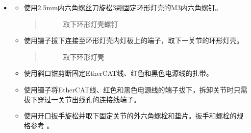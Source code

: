 \documentclass[a4paper,11pt,english,openany,oneside]{sphinxmanual}
\begin{document}
\begin{itemize}
\begin{itemize}
\item {} 
\sphinxAtStartPar
缓慢将大臂取下，同时将线束从二关节的出线孔逐一抽出，为防止线束端子卡住，推荐先抽出电源线，再抽出EtherCAT线。
\begin{quote}

\begin{figure}[H]
\centering
\capstart

\noindent{}
\caption{分离大臂}\label{\detokenize{_u66f4_u6362_u5173_u8282:id117}}\end{figure}
\end{quote}

\end{itemize}

\item {} 
\sphinxAtStartPar
{}
\begin{itemize}
\item {} 
\sphinxAtStartPar
使用2.5mm内六角螺丝刀旋松3颗固定环形灯壳的M3内六角螺钉。
\begin{quote}

\begin{figure}[H]
\centering
\capstart

\noindent{}
\caption{取下环形灯壳螺钉}\label{\detokenize{_u66f4_u6362_u5173_u8282:id118}}\end{figure}
\end{quote}

\item {} 
\sphinxAtStartPar
使用镊子拔下连接至环形灯壳内灯板上的端子，取下一关节的环形灯壳。
\begin{quote}

\begin{figure}[H]
\centering
\capstart

\noindent{}
\caption{取下环形灯壳}\label{\detokenize{_u66f4_u6362_u5173_u8282:id119}}\end{figure}
\end{quote}

\item {} 
\sphinxAtStartPar
使用斜口钳剪断固定EtherCAT线、红色和黑色电源线的扎带。

\item {} 
\sphinxAtStartPar
使用镊子将EtherCAT线、红色和黑色电源线的端子拔下，拆卸关节时只需拔下穿过一关节出线孔的连接线端子。

\item {} 
\sphinxAtStartPar
使用开口扳手旋松并取下固定关节的外六角螺栓和垫片。扳手和螺栓的规格参考 {\hyperref[\detokenize{_u66f4_u6362_u5173_u8282:id9}]{}} 。
\begin{quote}


\end{quote}
\end{itemize}
\end{itemize}
\end{document}
